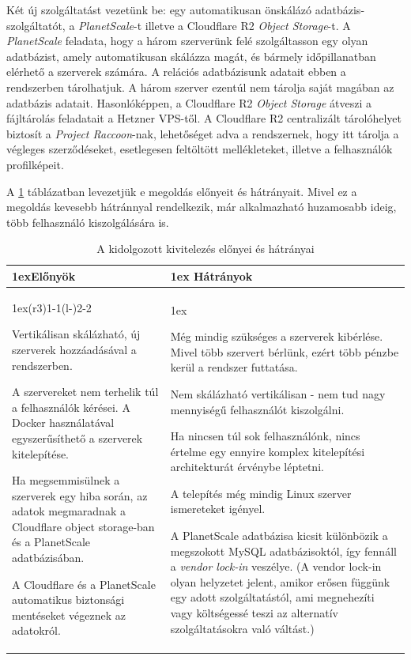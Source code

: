 Két új szolgáltatást vezetünk be: egy automatikusan önskálázó adatbázis-szolgáltatót, a \textit{PlanetScale}-t illetve a Cloudflare R2 \textit{Object Storage}-t. A \textit{PlanetScale} feladata, hogy a három szerverünk felé szolgáltasson egy olyan adatbázist, amely automatikusan skálázza magát, és bármely időpillanatban elérhető a szerverek számára. A relációs adatbázisunk adatait ebben a rendszerben tárolhatjuk. A három szerver ezentúl nem tárolja saját magában az adatbázis adatait. Hasonlóképpen, a Cloudflare R2 \textit{Object Storage} átveszi a fájltárolás feladatait a Hetzner VPS-től. A Cloudflare R2 centralizált tárolóhelyet biztosít a \textit{Project Raccoon}-nak, lehetőséget adva a rendszernek, hogy itt tárolja a végleges szerződéseket, esetlegesen feltöltött mellékleteket, illetve a felhasználók profilképeit.

A \ref{detailedprocon} táblázatban levezetjük e megoldás előnyeit és hátrányait. Mivel ez a megoldás kevesebb hátránnyal rendelkezik, már alkalmazható huzamosabb ideig, több felhasználó kiszolgálására is.

\begin{table}
\begin{tabularx}{\linewidth}{>{\parskip1ex}X@{\kern4\tabcolsep}>{\parskip1ex}X}
\toprule
\hfil\bfseries Előnyök
&
\hfil\bfseries Hátrányok
\\\cmidrule(r{3\tabcolsep}){1-1}\cmidrule(l{-\tabcolsep}){2-2}

Vertikálisan skálázható, új szerverek hozzáadásával a rendszerben.\par
A szervereket nem terhelik túl a felhasználók kérései.
A Docker használatával egyszerűsíthető a szerverek kitelepítése.\par
Ha megsemmisülnek a szerverek egy hiba során, az adatok megmaradnak a Cloudflare object storage-ban és a PlanetScale adatbázisában.\par
A Cloudflare és a PlanetScale automatikus biztonsági mentéseket végeznek az adatokról.\par

&

Még mindig szükséges a szerverek kibérlése. Mivel több szervert bérlünk, ezért több pénzbe kerül a rendszer futtatása.\par
Nem skálázható vertikálisan - nem tud nagy mennyiségű felhasználót kiszolgálni.\par
Ha nincsen túl sok felhasználónk, nincs értelme egy ennyire komplex kitelepítési architekturát érvénybe léptetni.\par
A telepítés még mindig Linux szerver ismereteket igényel.\par
A PlanetScale adatbázisa kicsit különbözik a megszokott MySQL adatbázisoktól, így fennáll a \textit{vendor lock-in} veszélye. (A vendor lock-in olyan helyzetet jelent, amikor erősen függünk egy adott szolgáltatástól, ami megnehezíti vagy költségessé teszi az alternatív szolgáltatásokra való váltást.)
\\\bottomrule
\end{tabularx}
\caption{A kidolgozott kivitelezés előnyei és hátrányai}
\label{detailedprocon}
\end{table}

